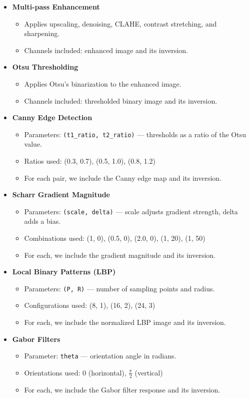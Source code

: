 \documentclass{article}
\begin{document}
\begin{itemize}
  \item \textbf{Multi-pass Enhancement}  
  \begin{itemize}
    \item Applies upscaling, denoising, CLAHE, contrast stretching, and sharpening.
    \item Channels included: enhanced image and its inversion.
  \end{itemize}

  \item \textbf{Otsu Thresholding}  
  \begin{itemize}
    \item Applies Otsu's binarization to the enhanced image.
    \item Channels included: thresholded binary image and its inversion.
  \end{itemize}

  \item \textbf{Canny Edge Detection}  
  \begin{itemize}
    \item Parameters: \texttt{(t1\_ratio, t2\_ratio)} — thresholds as a ratio of the Otsu value.
    \item Ratios used: (0.3, 0.7), (0.5, 1.0), (0.8, 1.2)
    \item For each pair, we include the Canny edge map and its inversion.
  \end{itemize}

  \item \textbf{Scharr Gradient Magnitude}  
  \begin{itemize}
    \item Parameters: \texttt{(scale, delta)} — scale adjusts gradient strength, delta adds a bias.
    \item Combinations used: (1, 0), (0.5, 0), (2.0, 0), (1, 20), (1, 50)
    \item For each, we include the gradient magnitude and its inversion.
  \end{itemize}

  \item \textbf{Local Binary Patterns (LBP)}  
  \begin{itemize}
    \item Parameters: \texttt{(P, R)} — number of sampling points and radius.
    \item Configurations used: (8, 1), (16, 2), (24, 3)
    \item For each, we include the normalized LBP image and its inversion.
  \end{itemize}

  \item \textbf{Gabor Filters}  
  \begin{itemize}
    \item Parameter: \texttt{theta} — orientation angle in radians.
    \item Orientations used: $0$ (horizontal), $\frac{\pi}{2}$ (vertical)
    \item For each, we include the Gabor filter response and its inversion.
  \end{itemize}
\end{itemize}
\end{document}
